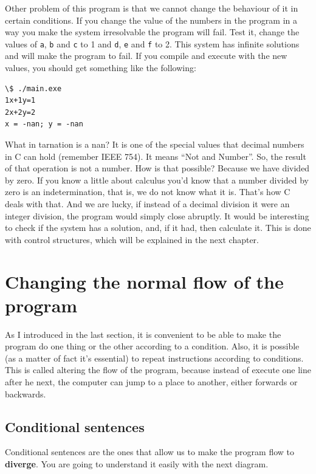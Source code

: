 \documentclass[a4paper]{article}
\begin{document}
Other problem of this program is that we cannot change the behaviour of it
in certain conditions. If you change the value of the numbers in the
program in a way you make the system irresolvable the program will fail.
Test it, change the values of \texttt{a}, \texttt{b} and \texttt{c} to 1 and
\texttt{d}, \texttt{e} and \texttt{f} to 2. This system has infinite solutions
and will make the program to fail. If you compile and execute with the new
values, you should get something like the following:

\noindent
\begin{minipage}[H]{\linewidth}
\mbox{}
\begin{lstlisting}[style=terminalStyle]
\$ ./main.exe
1x+1y=1
2x+2y=2
x = -nan; y = -nan
\end{lstlisting}
\end{minipage}

What in tarnation is a nan? It is one of the special values that decimal numbers
in C can hold (remember IEEE 754). It means ``Not and Number''.
So, the result of that operation is not a number. How is that
possible? Because we have divided by zero. If you know a little about calculus
you'd know that a number divided by zero is an indetermination, that is, we do
not know what it is. That's how C deals with that. And we are lucky, if instead
of a decimal division it were an integer division, the program would simply
close abruptly. It would be interesting to check if the system has a solution,
and, if it had, then calculate it. This is done with control structures, which
will be explained in the next chapter.

\section{Changing the normal flow of the program}
As I introduced in the last section, it is convenient to be able to make the
program do one thing or the other according to a condition. Also, it is possible
(as a matter of fact it's essential) to repeat instructions according to
conditions. This is called altering the flow of the program, because instead
of execute one line after he next, the computer can jump to a place to another,
either forwards or backwards.

\subsection{Conditional sentences}
Conditional sentences are the ones that allow us to make the program flow
to \textbf{diverge}. You are going to understand it easily with the next
diagram.
\end{document}
